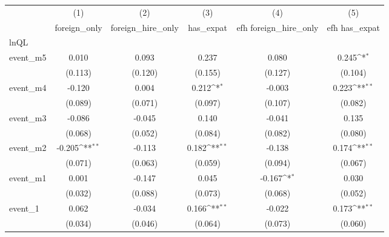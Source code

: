 {
\def\sym#1{\ifmmode^{#1}\else\(^{#1}\)\fi}
\begin{tabular}{l*{5}{c}}
\hline\hline
            &\multicolumn{1}{c}{(1)}&\multicolumn{1}{c}{(2)}&\multicolumn{1}{c}{(3)}&\multicolumn{1}{c}{(4)}&\multicolumn{1}{c}{(5)}\\
            &\multicolumn{1}{c}{foreign\_only}&\multicolumn{1}{c}{foreign\_hire\_only}&\multicolumn{1}{c}{has\_expat}&\multicolumn{1}{c}{efh foreign\_hire\_only}&\multicolumn{1}{c}{efh has\_expat}\\
\hline
lnQL        &                     &                     &                     &                     &                     \\
event\_m5    &       0.010         &       0.093         &       0.237         &       0.080         &       0.245\sym{*}  \\
            &     (0.113)         &     (0.120)         &     (0.155)         &     (0.127)         &     (0.104)         \\
[1em]
event\_m4    &      -0.120         &       0.004         &       0.212\sym{*}  &      -0.003         &       0.223\sym{**} \\
            &     (0.089)         &     (0.071)         &     (0.097)         &     (0.107)         &     (0.082)         \\
[1em]
event\_m3    &      -0.086         &      -0.045         &       0.140         &      -0.041         &       0.135         \\
            &     (0.068)         &     (0.052)         &     (0.084)         &     (0.082)         &     (0.080)         \\
[1em]
event\_m2    &      -0.205\sym{**} &      -0.113         &       0.182\sym{**} &      -0.138         &       0.174\sym{**} \\
            &     (0.071)         &     (0.063)         &     (0.059)         &     (0.094)         &     (0.067)         \\
[1em]
event\_m1    &       0.001         &      -0.147         &       0.045         &      -0.167\sym{*}  &       0.030         \\
            &     (0.032)         &     (0.088)         &     (0.073)         &     (0.068)         &     (0.052)         \\
[1em]
event\_1     &       0.062         &      -0.034         &       0.166\sym{**} &      -0.022         &       0.173\sym{**} \\
            &     (0.034)         &     (0.046)         &     (0.064)         &     (0.073)         &     (0.060)         \\

\end{tabular}}
